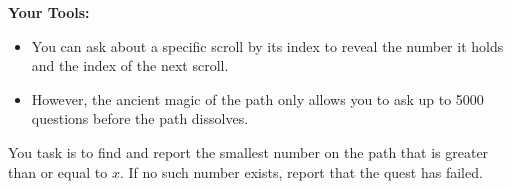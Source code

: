 \textbf{Your Tools:}
\begin{itemize}
    \item You can ask about a specific scroll by its index to reveal the number it holds and the index of the next scroll.
    \item However, the ancient magic of the path only allows you to ask up to 5000 questions before the path dissolves.
\end{itemize}

You task is to find and report the smallest number on the path that is greater than or equal to $x$. If no such number exists, report that the quest has failed.